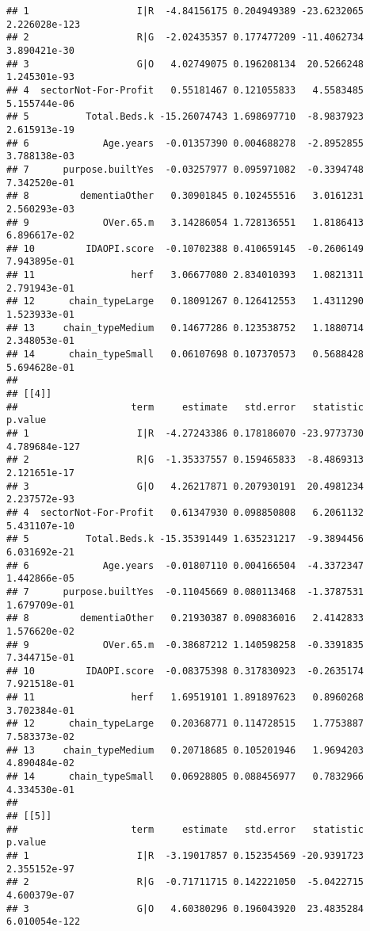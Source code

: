 \documentclass[]{article}
\begin{document}
\begin{verbatim}
## 1                   I|R  -4.84156175 0.204949389 -23.6232065 2.226028e-123
## 2                   R|G  -2.02435357 0.177477209 -11.4062734  3.890421e-30
## 3                   G|O   4.02749075 0.196208134  20.5266248  1.245301e-93
## 4  sectorNot-For-Profit   0.55181467 0.121055833   4.5583485  5.155744e-06
## 5          Total.Beds.k -15.26074743 1.698697710  -8.9837923  2.615913e-19
## 6             Age.years  -0.01357390 0.004688278  -2.8952855  3.788138e-03
## 7      purpose.builtYes  -0.03257977 0.095971082  -0.3394748  7.342520e-01
## 8         dementiaOther   0.30901845 0.102455516   3.0161231  2.560293e-03
## 9             OVer.65.m   3.14286054 1.728136551   1.8186413  6.896617e-02
## 10         IDAOPI.score  -0.10702388 0.410659145  -0.2606149  7.943895e-01
## 11                 herf   3.06677080 2.834010393   1.0821311  2.791943e-01
## 12      chain_typeLarge   0.18091267 0.126412553   1.4311290  1.523933e-01
## 13     chain_typeMedium   0.14677286 0.123538752   1.1880714  2.348053e-01
## 14      chain_typeSmall   0.06107698 0.107370573   0.5688428  5.694628e-01
## 
## [[4]]
##                    term     estimate   std.error   statistic       p.value
## 1                   I|R  -4.27243386 0.178186070 -23.9773730 4.789684e-127
## 2                   R|G  -1.35337557 0.159465833  -8.4869313  2.121651e-17
## 3                   G|O   4.26217871 0.207930191  20.4981234  2.237572e-93
## 4  sectorNot-For-Profit   0.61347930 0.098850808   6.2061132  5.431107e-10
## 5          Total.Beds.k -15.35391449 1.635231217  -9.3894456  6.031692e-21
## 6             Age.years  -0.01807110 0.004166504  -4.3372347  1.442866e-05
## 7      purpose.builtYes  -0.11045669 0.080113468  -1.3787531  1.679709e-01
## 8         dementiaOther   0.21930387 0.090836016   2.4142833  1.576620e-02
## 9             OVer.65.m  -0.38687212 1.140598258  -0.3391835  7.344715e-01
## 10         IDAOPI.score  -0.08375398 0.317830923  -0.2635174  7.921518e-01
## 11                 herf   1.69519101 1.891897623   0.8960268  3.702384e-01
## 12      chain_typeLarge   0.20368771 0.114728515   1.7753887  7.583373e-02
## 13     chain_typeMedium   0.20718685 0.105201946   1.9694203  4.890484e-02
## 14      chain_typeSmall   0.06928805 0.088456977   0.7832966  4.334530e-01
## 
## [[5]]
##                    term     estimate   std.error   statistic       p.value
## 1                   I|R  -3.19017857 0.152354569 -20.9391723  2.355152e-97
## 2                   R|G  -0.71711715 0.142221050  -5.0422715  4.600379e-07
## 3                   G|O   4.60380296 0.196043920  23.4835284 6.010054e-122

\end{verbatim}
\end{document}
